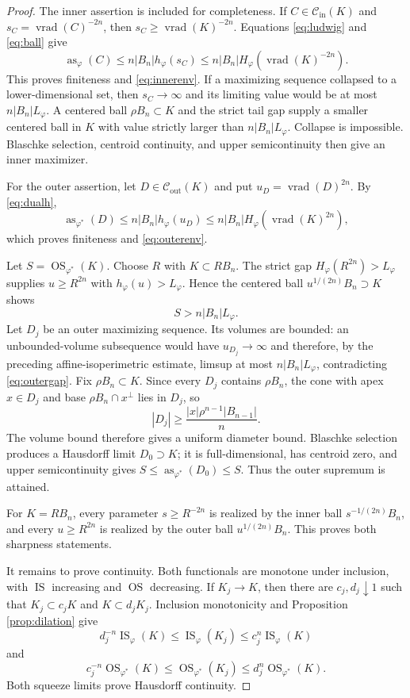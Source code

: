 \documentclass[11pt]{article}
\newcommand{\as}{\operatorname{as}}
\newcommand{\IS}{\operatorname{IS}}
\newcommand{\OS}{\operatorname{OS}}
\newcommand{\vrad}{\operatorname{vrad}}
\newcommand{\Cin}{\mathcal C_{\mathrm{in}}}
\newcommand{\Cout}{\mathcal C_{\mathrm{out}}}
\begin{document}
\begin{proof}
The inner assertion is included for completeness.  If $C\in\Cin(K)$ and
$s_C=\vrad(C)^{-2n}$, then $s_C\geq\vrad(K)^{-2n}$.  Equations
\eqref{eq:ludwig} and \eqref{eq:ball} give
\[
 \as_\varphi(C)\leq n|B_n|h_\varphi(s_C)
 \leq n|B_n|H_\varphi(\vrad(K)^{-2n}).
\]
This proves finiteness and \eqref{eq:innerenv}.  If a maximizing sequence
collapsed to a lower-dimensional set, then $s_C\to\infty$ and its limiting
value would be at most $n|B_n|L_\varphi$.  A centered ball $\rho B_n\subset K$
and the strict tail gap supply a smaller centered ball in $K$ with value
strictly larger than $n|B_n|L_\varphi$.  Collapse is impossible.  Blaschke
selection, centroid continuity, and upper semicontinuity then give an inner
maximizer.

For the outer assertion, let $D\in\Cout(K)$ and put
$u_D=\vrad(D)^{2n}$.  By \eqref{eq:dualh},
\[
 \as_{\varphi^*}(D)
 \leq n|B_n|h_\varphi(u_D)
 \leq n|B_n|H_\varphi(\vrad(K)^{2n}),
\]
which proves finiteness and \eqref{eq:outerenv}.

Let $S=\OS_{\varphi^*}(K)$.  Choose $R$ with $K\subset RB_n$.  The strict
gap $H_\varphi(R^{2n})>L_\varphi$ supplies $u\geq R^{2n}$ with
$h_\varphi(u)>L_\varphi$.  Hence the centered ball
$u^{1/(2n)}B_n\supset K$ shows
\begin{equation}\label{eq:outergap}
 S>n|B_n|L_\varphi.
\end{equation}
Let $D_j$ be an outer maximizing sequence.  Its volumes are bounded: an
unbounded-volume subsequence would have $u_{D_j}\to\infty$ and therefore,
by the preceding affine-isoperimetric estimate, limsup at most
$n|B_n|L_\varphi$, contradicting \eqref{eq:outergap}.  Fix
$\rho B_n\subset K$.  Since every $D_j$ contains $\rho B_n$, the cone with
apex $x\in D_j$ and base $\rho B_n\cap x^\perp$ lies in $D_j$, so
\[
 |D_j|\geq \frac{|x|\rho^{n-1}|B_{n-1}|}{n}.
\]
The volume bound therefore gives a uniform diameter bound.  Blaschke
selection produces a Hausdorff limit $D_0\supset K$; it is full-dimensional,
has centroid zero, and upper semicontinuity gives
$S\leq\as_{\varphi^*}(D_0)\leq S$.  Thus the outer supremum is attained.

For $K=RB_n$, every parameter $s\geq R^{-2n}$ is realized by the inner ball
$s^{-1/(2n)}B_n$, and every $u\geq R^{2n}$ is realized by the outer ball
$u^{1/(2n)}B_n$.  This proves both sharpness statements.

It remains to prove continuity.  Both functionals are monotone under
inclusion, with $\IS$ increasing and $\OS$ decreasing.  If $K_j\to K$, then
there are $c_j,d_j\downarrow1$ such that
$K_j\subset c_jK$ and $K\subset d_jK_j$.  Inclusion monotonicity and
Proposition \ref{prop:dilation} give
 \[
 d_j^{-n}\IS_\varphi(K)\leq\IS_\varphi(K_j)
 \leq c_j^n\IS_\varphi(K)
 \]
and
\[
 c_j^{-n}\OS_{\varphi^*}(K)\leq\OS_{\varphi^*}(K_j)
 \leq d_j^n\OS_{\varphi^*}(K).
\]
Both squeeze limits prove Hausdorff continuity.
\end{proof}
\end{document}
